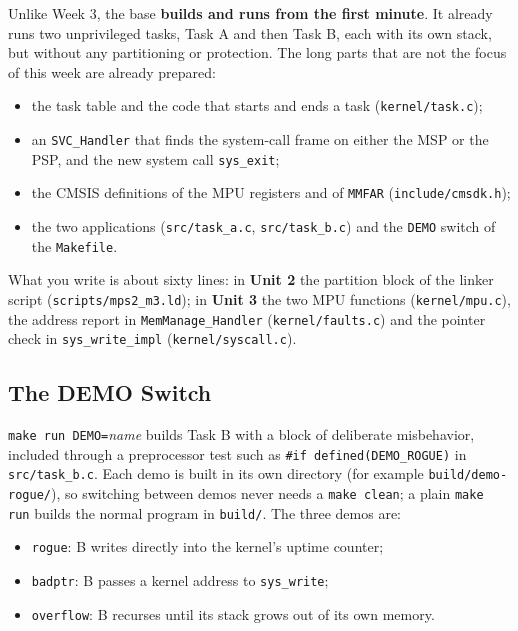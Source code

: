 Unlike Week 3, the base \textbf{builds and runs from the first minute}. It already runs two unprivileged tasks, Task A and then Task B, each with its own stack, but without any partitioning or protection. The long parts that are not the focus of this week are already prepared:
\begin{itemize}
    \item the task table and the code that starts and ends a task (\texttt{kernel/task.c});
    \item an \texttt{SVC\_Handler} that finds the system-call frame on either the MSP or the PSP, and the new system call \texttt{sys\_exit};
    \item the CMSIS definitions of the MPU registers and of \texttt{MMFAR} (\texttt{include/cmsdk.h});
    \item the two applications (\texttt{src/task\_a.c}, \texttt{src/task\_b.c}) and the \texttt{DEMO} switch of the \texttt{Makefile}.
\end{itemize}

What you write is about sixty lines: in \textbf{Unit 2} the partition block of the linker script (\texttt{scripts/mps2\_m3.ld}); in \textbf{Unit 3} the two MPU functions (\texttt{kernel/mpu.c}), the address report in \texttt{MemManage\_Handler} (\texttt{kernel/faults.c}) and the pointer check in \texttt{sys\_write\_impl} (\texttt{kernel/syscall.c}).

\subsection{The DEMO Switch}

\texttt{make run DEMO=}\textit{name} builds Task B with a block of deliberate misbehavior, included through a preprocessor test such as \texttt{\#if defined(DEMO\_ROGUE)} in \texttt{src/task\_b.c}. Each demo is built in its own directory (for example \texttt{build/demo-rogue/}), so switching between demos never needs a \texttt{make clean}; a plain \texttt{make run} builds the normal program in \texttt{build/}. The three demos are:

\begin{itemize}
    \item \texttt{rogue}: B writes directly into the kernel's uptime counter;
    \item \texttt{badptr}: B passes a kernel address to \texttt{sys\_write};
    \item \texttt{overflow}: B recurses until its stack grows out of its own memory.
\end{itemize}

